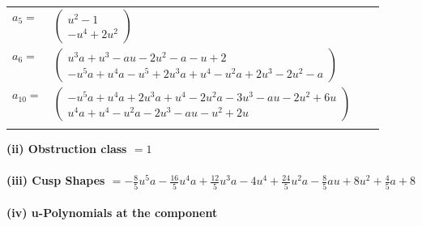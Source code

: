 \documentclass[1p]{elsarticle_modified}
\theoremstyle{definition}
\begin{document}
\begin{tabular}{m{7pt} m{180pt} m{7pt} m{180pt} }
\flushright $a_{5}=$&$\begin{pmatrix}u^2-1\\- u^4+2 u^2\end{pmatrix}$ \\
\flushright $a_{6}=$&$\begin{pmatrix}u^3 a+u^3- a u-2 u^2- a- u+2\\- u^5 a+u^4 a- u^5+2 u^3 a+u^4- u^2 a+2 u^3-2 u^2- a\end{pmatrix}$ \\
\flushright $a_{10}=$&$\begin{pmatrix}- u^5 a+u^4 a+2 u^3 a+u^4-2 u^2 a-3 u^3- a u-2 u^2+6 u\\u^4 a+u^4- u^2 a-2 u^3- a u- u^2+2 u\end{pmatrix}$\\&\end{tabular}
\flushleft \textbf{(ii) Obstruction class $= 1$}\\~\\
\flushleft \textbf{(iii) Cusp Shapes $= -\frac{8}{5} u^5 a-\frac{16}{5} u^4 a+\frac{12}{5} u^3 a-4 u^4+\frac{24}{5} u^2 a-\frac{8}{5} a u+8 u^2+\frac{4}{5} a+8$}\\~\\
\newpage\renewcommand{\arraystretch}{1}
\flushleft \textbf{(iv) u-Polynomials at the component}\newline \\
\end{document}

